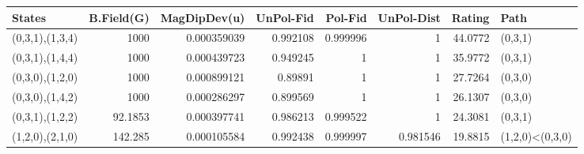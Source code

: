 \begin{tabular}{lrrrrrrl}
\hline
 States          &   B.Field(G) &   MagDipDev(u) &   UnPol-Fid &   Pol-Fid &   UnPol-Dist &   Rating & Path            \\
\hline
 (0,3,1),(1,3,4) &    1000      &    0.000359039 &    0.992108 &  0.999996 &     1        &  44.0772 & (0,3,1)         \\
 (0,3,1),(1,4,4) &    1000      &    0.000439723 &    0.949245 &  1        &     1        &  35.9772 & (0,3,1)         \\
 (0,3,0),(1,2,0) &    1000      &    0.000899121 &    0.89891  &  1        &     1        &  27.7264 & (0,3,0)         \\
 (0,3,0),(1,4,2) &    1000      &    0.000286297 &    0.899569 &  1        &     1        &  26.1307 & (0,3,0)         \\
 (0,3,1),(1,2,2) &      92.1853 &    0.000397741 &    0.986213 &  0.999522 &     1        &  24.3081 & (0,3,1)         \\
 (1,2,0),(2,1,0) &     142.285  &    0.000105584 &    0.992438 &  0.999997 &     0.981546 &  19.8815 & (1,2,0)<(0,3,0) \\
\hline
\end{tabular}